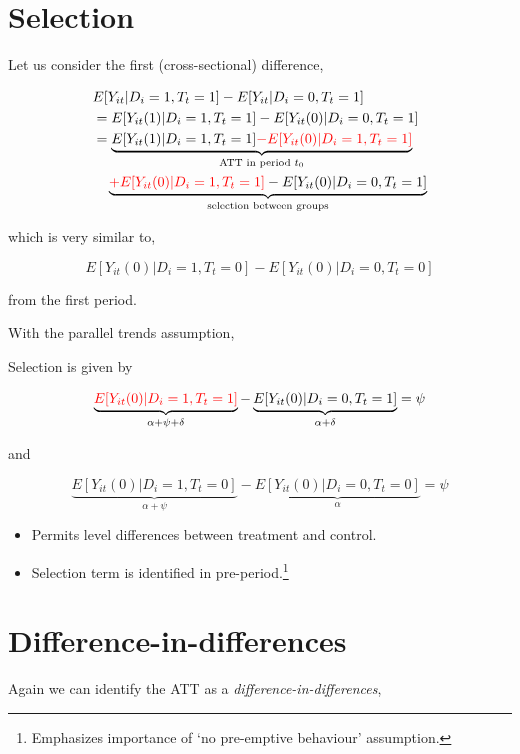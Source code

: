 \documentclass[
  letterpaper,
  DIV=11,
  numbers=noendperiod]{scrreprt}
\providecommand{\tightlist}{%
  \setlength{\itemsep}{0pt}\setlength{\parskip}{0pt}}\usepackage{longtable,booktabs,array}
\theoremstyle{definition}
\theoremstyle{remark}
\begin{document}
\begin{enumerate}
  \section{Selection}\label{selection-1}

  Let us consider the first (cross-sectional) difference,

  \[
  \begin{aligned}
  &E[Y_{it}|D_i=1,T_t=1] - E[Y_{it}|D_i=0,T_t=1] \\
  &= E[Y_{it}(1)|D_i=1,T_t=1] - E[Y_{it}(0)|D_i=0,T_t=1] \\
  &= \underbrace{E[Y_{it}(1)|D_i=1,T_t=1] \textcolor{red}{- E[Y_{it}(0)|D_i=1,T_t=1]}}_{\text{ATT in period } t_0} \\
  &\quad \underbrace{\textcolor{red}{+ E[Y_{it}(0)|D_i=1,T_t=1]} - E[Y_{it}(0)|D_i=0,T_t=1]}_{\text{selection between groups}}
  \end{aligned}
  \]

  which is very similar to,

  \[
  E[Y_{it}(0)|D_i=1,T_t=0] - E[Y_{it}(0)|D_i=0,T_t=0]
  \]

  from the first period.

  With the parallel trends assumption,

  Selection is given by

  \[
  \underbrace{\textcolor{red}{E[Y_{it}(0)|D_i=1,T_t=1]}}_{\alpha + \psi + \delta} - \underbrace{E[Y_{it}(0)|D_i=0,T_t=1]}_{\alpha + \delta} = \psi
  \]

  and

  \[
  \underbrace{E[Y_{it}(0)|D_i=1,T_t=0]}_{\alpha + \psi} - \underbrace{E[Y_{it}(0)|D_i=0,T_t=0]}_{\alpha} = \psi
  \]

  \begin{itemize}
  \tightlist
  \item
    Permits level differences between treatment and control.
  \item
    Selection term is identified in pre-period.\footnote{Emphasizes
      importance of `no pre-emptive behaviour' assumption.}
  \end{itemize}

  \section{Difference-in-differences}\label{difference-in-differences}

  Again we can identify the ATT as a \emph{difference-in-differences},


\end{enumerate}
\end{document}
